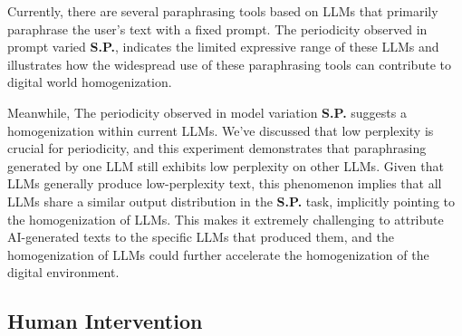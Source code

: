 Currently, there are several paraphrasing tools based on LLMs that primarily paraphrase the user's text with a fixed prompt. 
The periodicity observed in prompt varied \textbf{S.P.}, indicates the limited expressive range of these LLMs and illustrates how the widespread use of these paraphrasing tools can contribute to digital world homogenization.

Meanwhile, The periodicity observed in model variation \textbf{S.P.} suggests a homogenization within current LLMs. We've discussed that low perplexity is crucial for periodicity, and this experiment demonstrates that paraphrasing generated by one LLM still exhibits low perplexity on other LLMs. Given that LLMs generally produce low-perplexity text, this phenomenon implies that all LLMs share a similar output distribution in the \textbf{S.P.} task, implicitly pointing to the homogenization of LLMs.
This makes it extremely challenging to attribute AI-generated texts to the specific LLMs that produced them, and the homogenization of LLMs could further accelerate the homogenization of the digital environment.




\subsection{Human Intervention}

